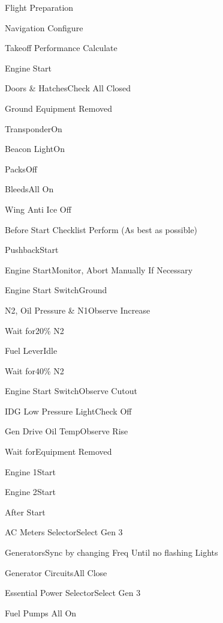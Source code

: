 \documentclass[sim-use]{checklist}
\begin{document}
\begin{checklist} {Flight Preparation }
    \item{Navigation} {Configure}
    \item{Takeoff Performance} {Calculate}
\end{checklist}

\begin{checklist}{Engine Start}
    \item{Doors \& Hatches}{Check All Closed}
    \item{Ground Equipment} {Removed}
    \item{Transponder}{On}
    \item{Beacon Light}{On}
    \item{Packs}{Off}
    \item {Bleeds}{All On}
    \item{Wing Anti Ice} {Off}
    \item{Before Start Checklist} {Perform (As best as possible)}
    \item{Pushback}{Start}
    \item{Engine Start}{Monitor, Abort Manually If Necessary }
     {
        \item{Engine Start Switch}{Ground}
        \item{N2, Oil Pressure \& N1}{Observe Increase}
        \item{Wait for}{20\% N2}
        \item{Fuel Lever}{Idle}
        \item{Wait for}{40\% N2}
        \item{Engine Start Switch}{Observe Cutout}
        \item{IDG Low Pressure Light}{Check Off}
        \item{Gen Drive Oil Temp}{Observe Rise}
    }
    \item{Wait for}{Equipment Removed}
    \item{Engine 1}{Start}
    \item{Engine 2}{Start}
\end{checklist}

\begin{checklist}{After Start}
    \item{AC Meters Selector}{Select Gen 3}
    \item{Generators}{Sync by changing Freq Until no flashing Lights}
    \item{Generator Circuits}{All Close}
    \item{Essential Power Selector}{Select Gen 3}
    \item{Fuel Pumps} {All On}
\end{checklist}
\end{document}
